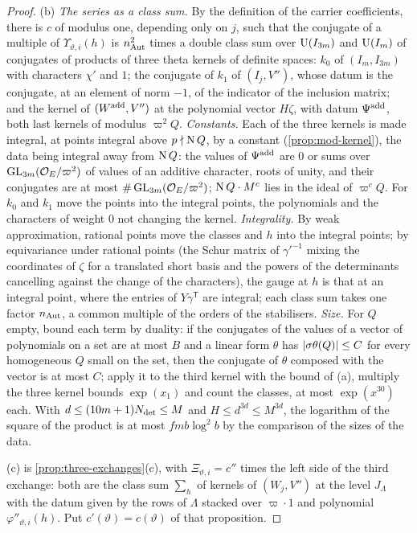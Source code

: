 \begin{proof}
(b) \emph{The series as a class sum.} By the definition of the carrier coefficients, there is $c$ of modulus one, depending only on $j$, such that the conjugate of a multiple of $\Upsilon_{\vartheta,i}(h)$ is $n_{\rm Aut}^2$ times a double class sum
over $\operatorname{U}(I_{3m})$ and $\operatorname{U}(I_m)$ of conjugates of products of three theta kernels of definite spaces: $k_0$ of $(I_m,I_{3m})$ with characters $\chi'$ and $1$; the conjugate of $k_1$ of $(I_j,V'')$, whose datum is the conjugate, at an element of norm
$-1$, of the indicator of the inclusion matrix; and the kernel of $(W^{\rm add},V'')$ at the polynomial vector $H\zeta$, with datum $\Psi^{\rm add}$, both last kernels of modulus $\varpi^2Q$. \emph{Constants.} Each of the three kernels is made
integral, at points integral above $p\nmid\operatorname{N} Q$, by a constant (\cref{prop:mod-kernel}), the data being integral away from $\operatorname{N} Q$: the values of $\Psi^{\rm add}$ are $0$ or sums over $\operatorname{GL}_{3m}(\mathcal{O}_E/\varpi^2)$ of values of an additive character, roots of
unity, and their conjugates are at most $\#\operatorname{GL}_{3m}(\mathcal{O}_E/\varpi^2)$; $\operatorname{N} Q\cdot M^c$ lies in the ideal of $\varpi^cQ$. For $k_0$ and $k_1$ move the points into the integral points, the polynomials and the characters of weight $0$ not changing
the kernel. \emph{Integrality.} By weak approximation, rational points move the classes and $h$ into the integral points; by equivariance under rational points (the Schur matrix of $\gamma'^{-1}$ mixing the coordinates of $\zeta$ for a translated
short basis and the powers of the determinants cancelling against the change of the characters), the gauge at $h$ is that at an integral point, where the entries of $Y\gamma^{\mathsf T}$ are integral; each class sum takes one factor $n_{\rm Aut}$,
a common multiple of the orders of the stabilisers. \emph{Size.} For $Q$ empty, bound each term by duality: if the conjugates of the values of a vector of polynomials on a set are at most $B$ and a linear form $\theta$ has
$\lvert \sigma\theta(Q)\rvert\le C$ for every homogeneous $Q$ small on the set, then the conjugate of $\theta$ composed with the vector is at most $C$; apply it to the third kernel with the bound of (a), multiply the three kernel bounds
$\exp(x_1)$ and count the classes, at most $\exp(x^{30})$ each. With $d\le(10m+1)N_{\rm det}\le M$ and $H\le d^{3d}\le M^{3d}$, the logarithm of the square of the product is at most $fmb\log^2b$ by the comparison of the sizes of the data.

(c) is \cref{prop:three-exchanges}(c), with $\Xi_{\vartheta,i}=c''$ times the left side of the third exchange: both are the class sum $\sum_h$ of kernels of $(W_j,V'')$ at the level $J_\Lambda$ with the datum given by the rows of $\Lambda$ stacked over
$\varpi\cdot1$ and polynomial $\varphi''_{\vartheta,i}(h)$. Put $c'(\vartheta)=c(\vartheta)$ of that proposition.
\end{proof}

